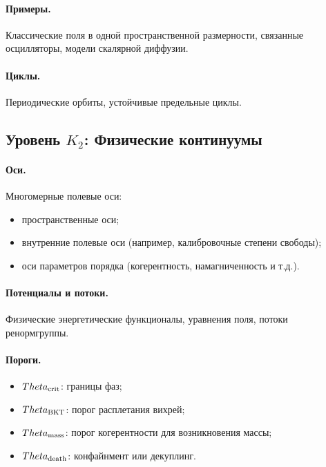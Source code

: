 \paragraph{Примеры.}
Классические поля в одной пространственной размерности, связанные осцилляторы,
модели скалярной диффузии.

\paragraph{Циклы.}
Периодические орбиты, устойчивые предельные циклы.


\subsection{Уровень \texorpdfstring{\texorpdfstring{$K_2$}{K\_2}}{K2}: Физические континуумы}

\paragraph{Оси.}
Многомерные полевые оси:
\begin{itemize}
    \item пространственные оси;
    \item внутренние полевые оси (например, калибровочные степени свободы);
    \item оси параметров порядка (когерентность, намагниченность и т.д.).
\end{itemize}

\paragraph{Потенциалы и потоки.}
Физические энергетические функционалы, уравнения поля, потоки ренормгруппы.

\paragraph{Пороги.}
\begin{itemize}
    \item \(\Theta_{\rm crit}\): границы фаз;
    \item \(\Theta_{\rm BKT}\): порог расплетания вихрей;
    \item \(\Theta_{\rm mass}\): порог когерентности для возникновения массы;
    \item \(\Theta_{\rm death}\): конфайнмент или декуплинг.
\end{itemize}

